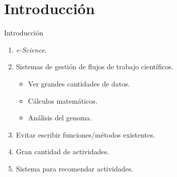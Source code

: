 \section{Introducción}

\begin{frame}		
	\begin{block}{Introducción}
		 \begin{enumerate}
		  \item \emph{e-Science}.
		  \item Sistemas de gestión de flujos de trabajo científicos.
			  \begin{itemize}
			  	\item Ver grandes cantidades de datos.
				\item Cálculos matemáticos.
				\item Análisis del genoma.
			  \end{itemize}
		  \item Evitar escribir funciones/métodos existentes.
		  \item Gran cantidad de actividades.
		  \item Sistema para recomendar actividades.
		 \end{enumerate}
	\end{block}
\end{frame}